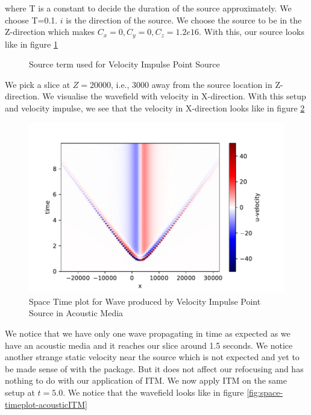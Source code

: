 where T is a constant to decide the duration of the source approximately. We choose T=0.1. $i$ is the direction of the source. 
We choose the source to be in the Z-direction which makes $C_x = 0, C_y = 0, C_z = 1.2e16$. With this, our source looks like in figure \ref{fig:source}

\begin{figure}
    \centering
    \caption{Source term used for Velocity Impulse Point Source}
    \label{fig:source}
\end{figure}

We pick a slice at $Z=20000$, i.e., 3000 away from the source location in Z-direction.
We visualise the wavefield with velocity in X-direction. With this setup and velocity impulse, we see that the velocity in X-direction
looks like in figure \ref{fig:space-timeplot-acousticnoITM}

\begin{figure}
    \centering
    \includegraphics[width=0.75\linewidth]{figures/Acoustic-noITM.pdf}
    \caption{Space Time plot for Wave produced by Velocity Impulse Point Source in Acoustic Media}
    \label{fig:space-timeplot-acousticnoITM}
\end{figure}

We notice that we have only one wave propagating in time as expected as we have an acoustic media and it reaches our slice around 1.5 seconds. We notice another 
strange static velocity near the source which is not expected and yet to be made sense of with the package. But it does not affect our refocusing and has nothing to do with
our application of \ac{ITM}. We now apply ITM on the same setup at $t=5.0$. We notice that the wavefield looks like in figure \ref{fig:space-timeplot-acousticITM}

